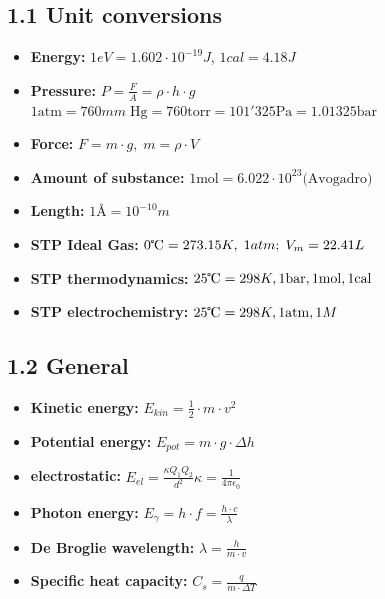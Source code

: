\subsection{1.1 Unit conversions}
	\begin{itemize}
		\itemsep0em
		\raggedright
  		\item \textbf{Energy:} $1eV=1.602\cdot 10^{-19}J$,    $1cal=4.18J$
    	\item \textbf{Pressure:} $P = \frac{F}{A} = \rho \cdot h \cdot g$\\ $1 \textrm{atm} = 760mm \; \textrm{Hg} = 760 \textrm{torr} = 101'325 \textrm{Pa} = 1.01325 \textrm{bar}$ 
    	\item \textbf{Force:} $F = m \cdot g, \; m = \rho \cdot V$
		\item \textbf{Amount of substance:} $1 \textrm{mol} = 6.022\cdot 10^{23} \textrm{(Avogadro)}$
    	\item \textbf{Length:} $1\text{Å}=10^{-10}m$
    	\item \textbf{STP Ideal Gas:} $0\tccentigrade = 273.15K, \; 1atm; \; V_m = 22.41L$
    	\item \textbf{STP thermodynamics: } $25\tccentigrade=298K, 1\textrm{bar}, 1 \textrm{mol}, 1 \textrm{cal}$
    	\item \textbf{STP electrochemistry: } $25\tccentigrade=298K, 1 \textrm{atm}, 1 M$
	\end{itemize}

\subsection{1.2 General}
    \begin{itemize}
		\itemsep0em
        \item \textbf{Kinetic energy:} $E_{kin} = \frac{1}{2} \cdot m \cdot v^2$
        \item \textbf{Potential energy:} $E_{pot} = m \cdot g \cdot \Delta h$
        \item \textbf{electrostatic:} $E_{el}=\frac{\kappa Q_1Q_2}{d^2}$\quad $\kappa = \frac{1}{4\pi \epsilon_0}$
        \item \textbf{Photon energy: } $E_\gamma = h\cdot f = \frac{h\cdot c}{\lambda}$
        \item \textbf{De Broglie wavelength: } $\lambda = \frac{h}{m\cdot v}$
        \item \textbf{Specific heat capacity: }$C_s=\frac{q}{m\cdot\Delta T}$
    \end{itemize}
    	
